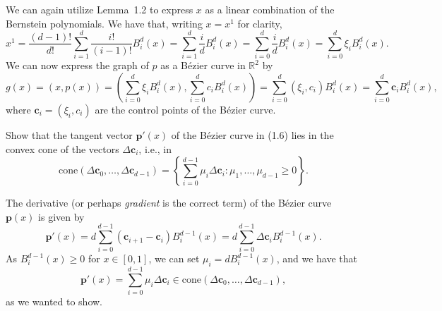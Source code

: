 \begin{solution}
    We can again utilize Lemma~1.2 to express $x$ as a linear combination of the Bernstein polynomials.
    We have that, writing $x = x^1$ for clarity,
    \begin{equation*}
        x^1 = \frac{(d - 1)!}{d!} \sum_{i = 1}^d \frac{i!}{(i - 1)!} B_i^d(x) = \sum_{i = 1}^d \frac{i}{d} B_i^d(x) = \sum_{i = 0}^d \frac{i}{d} B_i^d(x) = \sum_{i = 0}^d \xi_i B_i^d(x).
    \end{equation*}
    We can now express the graph of $p$ as a Bézier curve in $\mathbb{R}^2$ by
    \begin{equation*}
        g(x)
        = (x, p(x))
        = \left(
            \sum_{i = 0}^d \xi_i B_i^d(x), \sum_{i = 0}^d c_i B_i^d(x)
        \right)
        = \sum_{i = 0}^d (\xi_i, c_i) B_i^d(x)
        = \sum_{i = 0}^d \boldsymbol{c}_i B_i^d(x),
    \end{equation*}
    where $\boldsymbol{c}_i = (\xi_i, c_i)$ are the control points of the Bézier curve.
\end{solution}

\begin{exercise}
    Show that the tangent vector $\boldsymbol{p}'(x)$ of the Bézier curve in (1.6) lies in the convex cone of the vectors $\Delta \boldsymbol{c}_i$, i.e., in
    \begin{equation*}
        \text{cone}(\Delta \boldsymbol{c}_0, \ldots, \Delta \boldsymbol{c}_{d-1})
        = \left\{
            \sum_{i = 0}^{d-1} \mu_i \Delta \boldsymbol{c}_i
            : \mu_1, \ldots, \mu_{d-1} \geq 0
        \right\}.
    \end{equation*}
\end{exercise}

\begin{solution}
    The derivative (or perhaps \textit{gradient} is the correct term) of the Bézier curve $\boldsymbol{p}(x)$ is given by
    \begin{equation*}
        \boldsymbol{p}'(x)
        = d \sum_{i = 0}^{d-1} \left(
            \boldsymbol{c}_{i+1} - \boldsymbol{c}_i
        \right) B_i^{d-1}(x)
        = d \sum_{i = 0}^{d-1} \Delta \boldsymbol{c}_i B_i^{d-1}(x).
    \end{equation*}
    As $B_i^{d-1}(x) \geq 0$ for $x \in [0, 1]$, we can set $\mu_i = d B_i^{d-1}(x)$, and we have that
    \begin{equation*}
        \boldsymbol{p}'(x) = \sum_{i = 0}^{d-1} \mu_i \Delta \boldsymbol{c}_i \in \text{cone}(\Delta \boldsymbol{c}_0, \ldots, \Delta \boldsymbol{c}_{d-1}),
    \end{equation*}
    as we wanted to show.
\end{solution}

